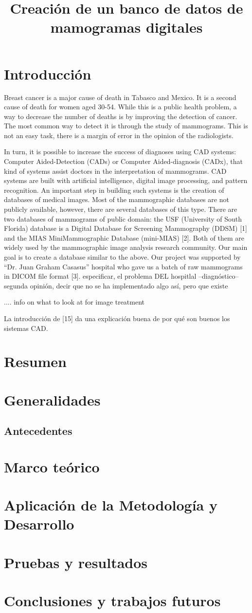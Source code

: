 \documentclass[11pt, a4paper, oneside]{book}
\begin{document}
\title{Creación de un banco de datos de mamogramas digitales}
\maketitle
\tableofcontents

\chapter{Introducción}
{\selectfont
Breast cancer is a major cause of death in Tabasco and Mexico. It is a second
cause of death for women aged 30-54. While this is a public health problem, a
way to decrease the number of deaths is by improving the detection of cancer.
The most common way to detect it is through the study of mammograms. This is
not an easy task, there is a margin of error in the opinion of the
radiologists.}

In turn, it is possible to increase the success of diagnoses
using CAD systems: Computer Aided-Detection (CADs) or Computer Aided-diagnosis
(CADx), that kind of systems assist doctors in the interpretation of
mammograms. CAD systems are built with artificial intelligence, digital image
processing, and pattern recognition.  An important step in building such
systems is the creation of databases of medical images. Most of the
mammographic databases are not publicly available, however, there are several
databases of this type. There are two databases of mammograms of public domain:
the USF (University of South Florida) database is a Digital Database for
Screening Mammography (DDSM) [1] and the MIAS MiniMammographic Database
(mini-MIAS) [2]. Both of them are widely used by the mammographic image
analysis research community.  Our main goal is to create a database similar to
the above.  Our project was supported by “Dr. Juan Graham Casasus” hospital who
gave us a batch of raw mammograms in DICOM file format [3].  especificar, el
problema DEL hospitlal --diagnóstico-- segunda opinión, decir que no se ha
implementado algo así, pero que existe
 

.... info on what to look at for image treatment 

La introducción de [15] da una explicación buena de por qué son buenos los
sistemas CAD.

\chapter{Resumen}
\chapter{Generalidades}
\section{Antecedentes}
\chapter{Marco teórico}
\chapter{Aplicación de la Metodología y Desarrollo}
\chapter{Pruebas y resultados}
\chapter{Conclusiones y trabajos futuros}
\end{document}
